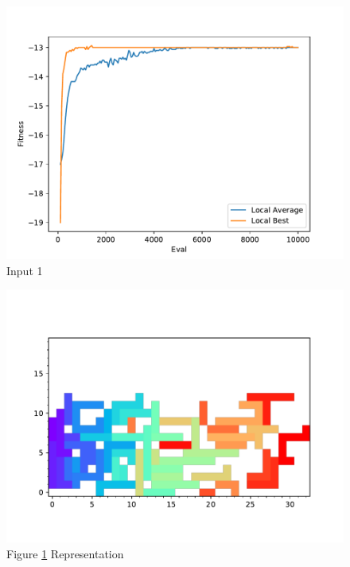 \documentclass{standalone}
\begin{document}
\begin{figure}[!htb]
	\caption{Input 1}
	\label{fig:graph_1002}
	\includegraphics[width=\textwidth]{../graphs/graphs/1002.pdf}
\end{figure}


\begin{figure}[!htb]
	\caption{Figure \ref{fig:graph_1002} Representation}
	\label{fig:picture_1002}
	\includegraphics[width=\textwidth]{../graphs/picture/1002.pdf}
\end{figure}
\end{document}
